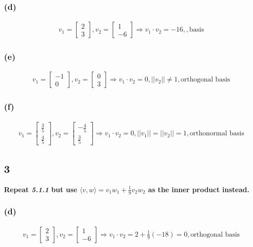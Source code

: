 \documentclass[10pt,letterpaper]{article}
\begin{document}
	\subsubsection*{(d)}
		\begin{align*}
		& v_1 = \begin{bmatrix}
		2 \\ 3
		\end{bmatrix}, v_2 = \begin{bmatrix}
		1 \\ -6 
		\end{bmatrix} \Rightarrow v_1 \cdot v_2 = -16, , \boxed{\text{basis}}
		\end{align*}
	\subsubsection*{(e)}
		\begin{align*}
		& v_1 = \begin{bmatrix}
		-1 \\ 0
		\end{bmatrix}, v_2 = \begin{bmatrix}
		0 \\ 3 
		\end{bmatrix} \Rightarrow v_1 \cdot v_2 = 0, ||v_2|| \neq 1, \boxed{\text{orthogonal basis}}
		\end{align*}
	\subsubsection*{(f)}
		\begin{align*}
		& v_1 = \begin{bmatrix}
		\frac{3}{5} \\ \frac{4}{5}
		\end{bmatrix}, v_2 = \begin{bmatrix}
		-\frac{4}{5} \\ \frac{3}{5} 
		\end{bmatrix} \Rightarrow v_1 \cdot v_2 = 0, ||v_1|| = ||v_2|| =  1, \boxed{\text{orthonormal basis}}
		\end{align*}
	\subsection*{3} \textbf{Repeat \textit{5.1.1} but use $\langle v,w \rangle = v_1w_1 + \frac{1}{9}v_2w_2$ as the inner product instead.}
	\subsubsection*{(d)}
	\begin{align*}
	& v_1 = \begin{bmatrix}
	2 \\ 3
	\end{bmatrix}, v_2 = \begin{bmatrix}
	1 \\ -6 
	\end{bmatrix} \Rightarrow v_1 \cdot v_2 = 2 + \frac{1}{9}(-18) = 0, \boxed{\text{orthogonal basis}}
	\end{align*}
\end{document}
